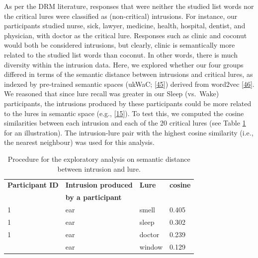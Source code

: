 \documentclass[
]{article}
\begin{document}
As per the DRM literature, responses that were neither the studied list words nor the critical lures were classified as (non-critical) intrusions. For instance, our participants studied nurse, sick, lawyer, medicine, health, hospital, dentist, and physician, with doctor as the critical lure. Responses such as clinic and coconut would both be considered intrusions, but clearly, clinic is semantically more related to the studied list words than coconut. In other words, there is much diversity within the intrusion data. Here, we explored whether our four groups differed in terms of the semantic distance between intrusions and critical lures, as indexed by pre-trained semantic spaces (ukWaC; {[}\protect\hyperlink{ref-baroni2009a}{45}{]}) derived from word2vec {[}\protect\hyperlink{ref-guenther2015a}{46}{]}. We reasoned that since lure recall was greater in our Sleep (vs.~Wake) participants, the intrusions produced by these participants could be more related to the lures in semantic space (e.g., {[}\protect\hyperlink{ref-mak2023a}{15}{]}). To test this, we computed the cosine similarities between each intrusion and each of the 20 critical lures (see Table \ref{tab:table8} for an illustration). The intrusion-lure pair with the highest cosine similarity (i.e., the nearest neighbour) was used for this analysis.

\begin{table}[H]

\caption{\label{tab:table8}Procedure for the exploratory analysis on semantic distance between intrusion and lure.}
\centering
\begin{tabular}[t]{llll}
\toprule
\textbf{Participant ID} & \textbf{Intrusion produced} & \textbf{Lure} & \textbf{cosine}\\
\textbf{} & \textbf{by a participant} & \textbf{} & \textbf{}\\
\midrule
1 & ear & smell & 0.405\\
1 & ear & sleep & 0.302\\
1 & ear & doctor & 0.239\\
\addlinespace
1 & ear & window & 0.129\\
\bottomrule
\end{tabular}
\end{table}
\end{document}
